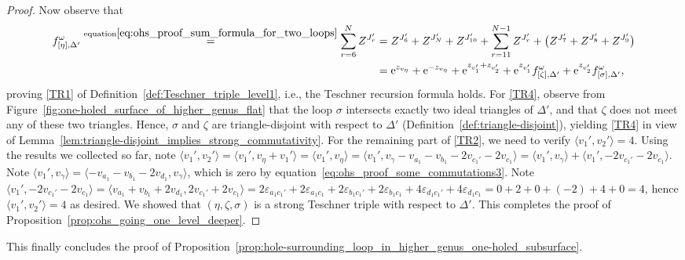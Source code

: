 \documentclass[pdftex]{sigma}
\numberwithin{equation}{section}
\theoremstyle{definition}
\begin{document}
\begin{proof}
Now observe that
\begin{align*}
f^\omega_{[\eta],\Delta'} \stackrel{{\rm equation} \eqref{eq:ohs_proof_sum_formula_for_two_loops}}{=}
\sum_{r=6}^{N} Z^{J_r'}
& = Z^{J_6'} + Z^{J_N'} +Z^{J_{10}'} + \sum_{r=11}^{N-1} Z^{J_r'} + \bigl(Z^{J_7'} + Z^{J_8'} + Z^{J_9'}\bigr)
 \\
& = {\rm e}^{z_{v_\eta}} + {\rm e}^{-z_{v_\eta}} + {\rm e}^{z_{v_1'} + z_{v_2'}} + {\rm e}^{z_{v_1'}} f^\omega_{[\zeta],\Delta'} + {\rm e}^{z_{v_2'}} f^\omega_{[\sigma],\Delta'},
\end{align*}
proving \ref{TR1} of Definition~\ref{def:Teschner_triple_level1}, i.e., the Teschner recursion formula holds.
For \ref{TR4}, observe from Figure~\ref{fig:one-holed_surface_of_higher_genus_flat} that the loop $\sigma$ intersects exactly two ideal triangles of $\Delta'$, and that $\zeta$ does not meet any of these two triangles. Hence, $\sigma$ and $\zeta$ are triangle-disjoint with respect to $\Delta'$ (Definition~\ref{def:triangle-disjoint}), yielding \ref{TR4} in view of Lemma~\ref{lem:triangle-disjoint_implies_strong_commutativity}.
For the remaining part of \ref{TR2}, we need to verify $\langle v_1' , v_2'\rangle=4$. Using the results we collected so far, note $\langle v_1' , v_2'\rangle = \langle v_1', v_\eta + v_1'\rangle = \langle v_1', v_\eta\rangle = \langle v_1', v_\gamma - v_{a_1} - v_{b_1} - 2v_{c_1'} - 2v_{c_1}\rangle = \langle v_1', v_\gamma\rangle + \langle v_1', -2 v_{c_1'} -2 v_{c_1}\rangle$. Note $\langle v_1', v_\gamma \rangle = \langle -v_{a_1}-v_{b_1}-2v_{d_1},v_\gamma \rangle$, which is zero by equation~\eqref{eq:ohs_proof_some_commutations3}. Note $\langle v_1', -2v_{c_1'} - 2v_{c_1}\rangle = \langle v_{a_1}+v_{b_1}+2v_{d_1}, 2v_{c_1'} + 2v_{c_1}\rangle =2\varepsilon_{a_1 c_1'} + 2\varepsilon_{a_1 c_1} + 2\varepsilon_{b_1 c_1'} + 2 \varepsilon_{b_1 c_1} + 4 \varepsilon_{d_1 c_1'} + 4 \varepsilon_{d_1 c_1} =0+2+0+(-2)+4+0=4$, hence $\langle v_1',v_2'\rangle=4$ as desired.
We showed that $(\eta,\zeta,\sigma)$ is a strong Teschner triple with respect to $\Delta'$.
This completes the proof of Proposition~\ref{prop:ohs_going_one_level_deeper}.
\end{proof}
This finally concludes the proof of Proposition~\ref{prop:hole-surrounding_loop_in_higher_genus_one-holed_subsurface}.
\end{document}
